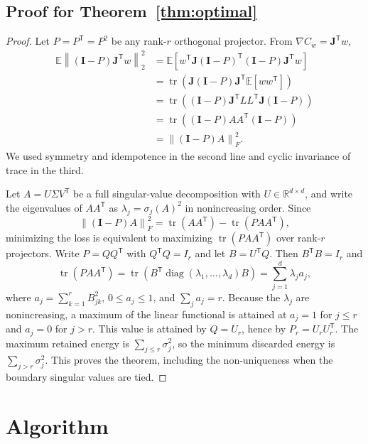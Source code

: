 \documentclass[aps,prx,reprint,superscriptaddress,floatfix]{revtex4-2}
\newcommand{\E}{\mathbb{E}}
\newcommand{\R}{\mathbb{R}}
\newcommand{\J}{\mathbf{J}}
\newcommand{\I}{\mathbf{I}}
\newcommand{\trans}{\mathsf{T}}
\newcommand{\norm}[1]{\left\lVert #1\right\rVert}
\begin{document}
\subsection{Proof for Theorem~\ref{thm:optimal}}
\label{app:proof-optimal}

\begin{proof}
Let $P=P^{\trans}=P^2$ be any rank-$r$ orthogonal projector.  From
$\nabla C_w=\J^{\trans}w$,
\begin{align}
 \E\norm{(\I-P)\J^{\trans}w}_2^2
 &=\E\!\left[
 w^{\trans}\J(\I-P)^{\trans}(\I-P)\J^{\trans}w
 \right] \nonumber\\
 &=\operatorname{tr}\!\left(
 \J(\I-P)\J^{\trans}\E[ww^{\trans}]
 \right) \nonumber\\
 &=\operatorname{tr}\!\left(
 (\I-P)\J^{\trans}LL^{\trans}\J(\I-P)
 \right) \nonumber\\
 &=\operatorname{tr}\!\left(
 (\I-P)AA^{\trans}(\I-P)
 \right) \nonumber\\
 &=\norm{(\I-P)A}_F^2.
\end{align}
We used symmetry and idempotence in the second line and cyclic invariance of
trace in the third.

Let $A=U\Sigma V^{\trans}$ be a full singular-value decomposition with
$U\in\R^{d\times d}$, and write the eigenvalues of
$AA^{\trans}$ as $\lambda_j=\sigma_j(A)^2$ in nonincreasing order.  Since
\[
 \norm{(\I-P)A}_F^2
 =\operatorname{tr}(AA^{\trans})
  -\operatorname{tr}(PAA^{\trans}),
\]
minimizing the loss is equivalent to maximizing
$\operatorname{tr}(PAA^{\trans})$ over rank-$r$ projectors.  Write
$P=QQ^{\trans}$ with $Q^{\trans}Q=I_r$ and let
$B=U^{\trans}Q$.  Then $B^{\trans}B=I_r$ and
\[
 \operatorname{tr}(PAA^{\trans})
 =\operatorname{tr}\!\left(B^{\trans}
 \operatorname{diag}(\lambda_1,\ldots,\lambda_d)B\right)
 =\sum_{j=1}^{d}\lambda_j a_j,
\]
where $a_j=\sum_{k=1}^{r}B_{jk}^2$, $0\le a_j\le1$, and
$\sum_j a_j=r$.  Because the $\lambda_j$ are nonincreasing, a maximum of the
linear functional is attained at $a_j=1$ for $j\le r$ and $a_j=0$ for
$j>r$.  This value is attained by $Q=U_r$, hence by
$P_r=U_rU_r^{\trans}$.  The maximum retained energy is
$\sum_{j\le r}\sigma_j^2$, so the minimum discarded energy is
$\sum_{j>r}\sigma_j^2$.  This proves the theorem, including the
non-uniqueness when the boundary singular values are tied.
\end{proof}

\section{Algorithm}
\end{document}

